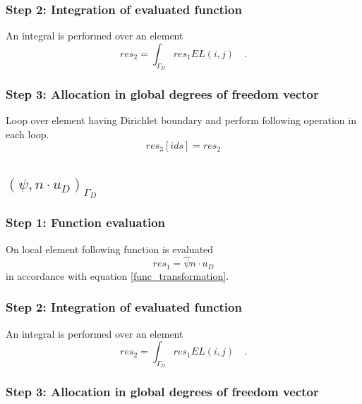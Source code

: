 \documentclass[a4paper,openany]{book}
\begin{document}
\subsubsection{Step 2: Integration of evaluated function}

An integral is performed over an element 
\begin{equation}
res_2=\int_{\Gamma_D} res_1 EL(i,j) \quad \textrm{.}
\end{equation}

\subsubsection{Step 3: Allocation in global degrees of freedom vector}

Loop over element having Dirichlet boundary and perform following operation in each loop. 
\begin{equation}
res_3[ids]=res_2
\end{equation}

\subsection{$(\psi, n \cdot u_D)_{\Gamma_D} $}

\subsubsection{Step 1: Function evaluation}

On local element following function is evaluated 
\begin{equation}
res_1 = \hat{\psi} n\cdot u_D
\end{equation} 
in accordance with equation \eqref{func_transformation}.\\

\subsubsection{Step 2: Integration of evaluated function}

An integral is performed over an element 
\begin{equation}
res_2 = \int_{\Gamma_D} res_1 EL(i,j) \quad \textrm{.}
\end{equation}

\subsubsection{Step 3: Allocation in global degrees of freedom vector}
\end{document}
